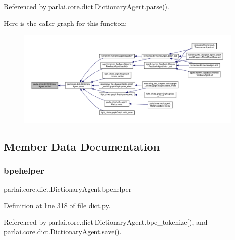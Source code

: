 Referenced by parlai.\+core.\+dict.\+Dictionary\+Agent.\+parse().

Here is the caller graph for this function\+:
\nopagebreak
\begin{figure}[H]
\begin{center}
\leavevmode
\includegraphics[width=350pt]{classparlai_1_1core_1_1dict_1_1DictionaryAgent_af2eeb50b2cd6cf3a8ca817b729ec7486_icgraph}
\end{center}
\end{figure}


\subsection{Member Data Documentation}
\mbox{\label{classparlai_1_1core_1_1dict_1_1DictionaryAgent_af2bfd8d00b4733c085a639521e727ceb}} 
\subsubsection{\texorpdfstring{bpehelper}{bpehelper}}
{\footnotesize\ttfamily parlai.\+core.\+dict.\+Dictionary\+Agent.\+bpehelper}



Definition at line 318 of file dict.\+py.



Referenced by parlai.\+core.\+dict.\+Dictionary\+Agent.\+bpe\+\_\+tokenize(), and parlai.\+core.\+dict.\+Dictionary\+Agent.\+save().

\mbox{\label{classparlai_1_1core_1_1dict_1_1DictionaryAgent_a3917720c8b31e5b99698beca63256511}} 
